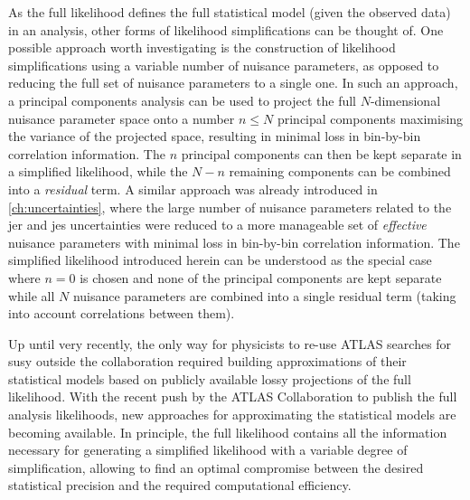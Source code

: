 As the full likelihood defines the full statistical model (given the observed data) in an analysis, other forms of likelihood simplifications can be thought of.
One possible approach worth investigating is the construction of likelihood simplifications using a variable number of nuisance parameters, as opposed to reducing the full set of nuisance parameters to a single one.
In such an approach, a principal components analysis can be used to project the full $N$-dimensional nuisance parameter space onto a number $n\leq N$ principal components maximising the variance of the projected space, \ie resulting in minimal loss in bin-by-bin correlation information.
The $n$ principal components can then be kept separate in a simplified likelihood, while the $N-n$ remaining components can be combined into a \textit{residual} term.
A similar approach was already introduced in \cref{ch:uncertainties}, where the large number of nuisance parameters related to the \gls{jer} and \gls{jes} uncertainties were reduced to a more manageable set of \textit{effective} nuisance parameters with minimal loss in bin-by-bin correlation information. The simplified likelihood introduced herein can be understood as the special case where $n=0$ is chosen and none of the principal components are kept separate while all $N$ nuisance parameters are combined into a single residual term (taking into account correlations between them).

Up until very recently, the only way for physicists to re-use ATLAS searches for \gls{susy} outside the collaboration required building approximations of their statistical models based on publicly available lossy projections of the full likelihood.
With the recent push by the ATLAS Collaboration to publish the full analysis likelihoods, new approaches for approximating the statistical models are becoming available.
In principle, the full likelihood contains all the information necessary for generating a simplified likelihood with a variable degree of simplification, allowing to find an optimal compromise between the desired statistical precision  and the required computational efficiency.




